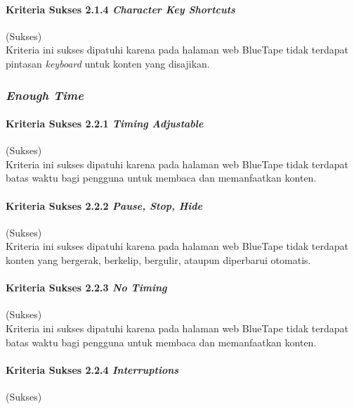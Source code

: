 \documentclass[a4paper,twoside]{article}
\begin{document}
\begin{enumerate}
		\paragraph{Kriteria Sukses 2.1.4 \textit{Character Key Shortcuts}}
		\label{par:kepatuhan_bluetape_kriteria_sukses_2.1.4}
		(Sukses)\\

		Kriteria ini sukses dipatuhi karena pada halaman web BlueTape tidak terdapat pintasan \textit{keyboard} untuk konten yang disajikan.

		\subsubsection*{\textit{Enough Time}}
		\label{subsubsec:kepatuhan_bluetape_enough_time}

		\paragraph{Kriteria Sukses 2.2.1 \textit{Timing Adjustable}}
		\label{par:kepatuhan_bluetape_kriteria_sukses_2.2.1}
		(Sukses)\\

		Kriteria ini sukses dipatuhi karena pada halaman web BlueTape tidak terdapat batas waktu bagi pengguna untuk membaca dan memanfaatkan konten.

		\paragraph{Kriteria Sukses 2.2.2 \textit{Pause, Stop, Hide}}
		\label{par:kepatuhan_bluetape_kriteria_sukses_2.2.2}
		(Sukses)\\

		Kriteria ini sukses dipatuhi karena pada halaman web BlueTape tidak terdapat konten yang bergerak, berkelip, bergulir, ataupun diperbarui otomatis.

		\paragraph{Kriteria Sukses 2.2.3 \textit{No Timing}}
		\label{par:kepatuhan_bluetape_kriteria_sukses_2.2.3}
		(Sukses)\\

		Kriteria ini sukses dipatuhi karena pada halaman web BlueTape tidak terdapat batas waktu bagi pengguna untuk membaca dan memanfaatkan konten.

		\paragraph{Kriteria Sukses 2.2.4 \textit{Interruptions}}
		\label{par:kepatuhan_bluetape_kriteria_sukses_2.2.4}
		(Sukses)\\


\end{enumerate}
\end{document}
